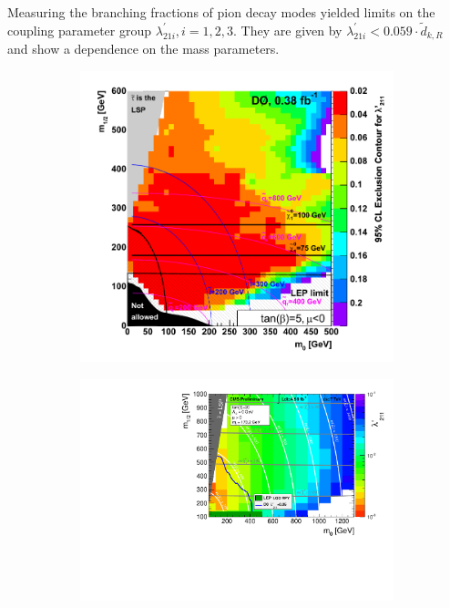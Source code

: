 \noindent Measuring the branching fractions of pion decay modes yielded limits on the coupling parameter group $\lambda^\prime_{21i}, i = 1, 2, 3$. They are given by $\lambda^\prime_{21i} < 0.059 \cdot \tilde{d}_{k, R}$~\cite{rpvimpl} and show a dependence on the mass parameters.

\begin{figure}[!htbp]
  \centering
  \begin{subfigure}[b]{0.77\textwidth}
    \centering
    \includegraphics[width=\textwidth]{plots/auterrpv.pdf}
    \caption{\label{fig:auterrpv}}
  \end{subfigure}
  \begin{subfigure}[b]{0.77\textwidth}
    \centering
    \includegraphics[width=\textwidth]{plots/2011-l211limits_MultiBin_logz-colz.pdf}

\end{subfigure}
\end{figure}
